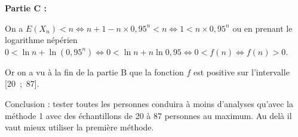 \textbf{Partie C :}

\medskip








On a $E\left(X_n\right)  < n \iff n + 1 - n \times 0,95^n < n \iff 1 < n \times 0,95^n$ ou en prenant le logarithme népérien $0 < \ln n + \ln \left(0,95^n\right) \iff 0 < \ln n + n \ln 0,95 \iff 0 < f(n) \iff f(n) > 0$.

Or on a vu à la fin de la partie B que la fonction $f$ est positive sur l'intervalle [20~;~87].

Conclusion : tester toutes les personnes conduira à moins d'analyses qu'avec la méthode 1 avec des échantillons de 20 à 87 personnes au maximum. Au delà il vaut mieux utiliser la première méthode.
\bigskip
